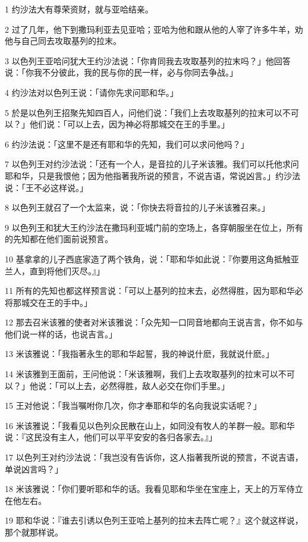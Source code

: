 \par 1 约沙法大有尊荣资财，就与亚哈结亲。
\par 2 过了几年，他下到撒玛利亚去见亚哈；亚哈为他和跟从他的人宰了许多牛羊，劝他与自己同去攻取基列的拉末。
\par 3 以色列王亚哈问犹大王约沙法说：「你肯同我去攻取基列的拉末吗？」他回答说：「你我不分彼此，我的民与你的民一样，必与你同去争战。」
\par 4 约沙法对以色列王说：「请你先求问耶和华。」
\par 5 於是以色列王招聚先知四百人，问他们说：「我们上去攻取基列的拉末可以不可以？」他们说：「可以上去，因为神必将那城交在王的手里。」
\par 6 约沙法说：「这里不是还有耶和华的先知，我们可以求问他吗？」
\par 7 以色列王对约沙法说：「还有一个人，是音拉的儿子米该雅。我们可以托他求问耶和华，只是我恨他；因为他指著我所说的预言，不说吉语，常说凶言。」约沙法说：「王不必这样说。」
\par 8 以色列王就召了一个太监来，说：「你快去将音拉的儿子米该雅召来。」
\par 9 以色列王和犹大王约沙法在撒玛利亚城门前的空场上，各穿朝服坐在位上，所有的先知都在他们面前说预言。
\par 10 基拿拿的儿子西底家造了两个铁角，说：「耶和华如此说：『你要用这角抵触亚兰人，直到将他们灭尽。』」
\par 11 所有的先知也都这样预言说：「可以上基列的拉末去，必然得胜，因为耶和华必将那城交在王的手中。」
\par 12 那去召米该雅的使者对米该雅说：「众先知一口同音地都向王说吉言，你不如与他们说一样的话，也说吉言。」
\par 13 米该雅说：「我指著永生的耶和华起誓，我的神说什麽，我就说什麽。」
\par 14 米该雅到王面前，王问他说：「米该雅啊，我们上去攻取基列的拉末可以不可以？」他说：「可以上去，必然得胜，敌人必交在你们手里。」
\par 15 王对他说：「我当嘱咐你几次，你才奉耶和华的名向我说实话呢？」
\par 16 米该雅说：「我看见以色列众民散在山上，如同没有牧人的羊群一般。耶和华说：『这民没有主人，他们可以平平安安的各归各家去。』」
\par 17 以色列王对约沙法说：「我岂没有告诉你，这人指著我所说的预言，不说吉语，单说凶言吗？」
\par 18 米该雅说：「你们要听耶和华的话。我看见耶和华坐在宝座上，天上的万军侍立在他左右。
\par 19 耶和华说：『谁去引诱以色列王亚哈上基列的拉末去阵亡呢？』这个就这样说，那个就那样说。
